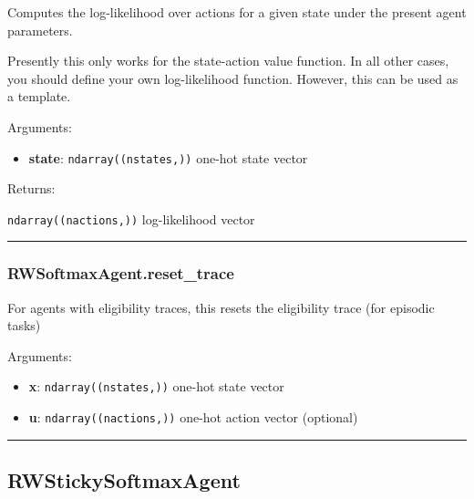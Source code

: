 Computes the log-likelihood over actions for a given state under the
present agent parameters.

Presently this only works for the state-action value function. In all
other cases, you should define your own log-likelihood function.
However, this can be used as a template.

Arguments:

\begin{itemize}
\tightlist
\item
  \textbf{state}: \texttt{ndarray((nstates,))} one-hot state vector
\end{itemize}

Returns:

\texttt{ndarray((nactions,))} log-likelihood vector

\begin{center}\rule{0.5\linewidth}{\linethickness}\end{center}

\subsubsection{RWSoftmaxAgent.reset\_trace}\label{rwsoftmaxagent.reset_trace}

\begin{Shaded}
\begin{Highlighting}[]
\OperatorTok{=}\NormalTok{)}
\end{Highlighting}
\end{Shaded}

For agents with eligibility traces, this resets the eligibility trace
(for episodic tasks)

Arguments:

\begin{itemize}
\tightlist
\item
  \textbf{x}: \texttt{ndarray((nstates,))} one-hot state vector
\item
  \textbf{u}: \texttt{ndarray((nactions,))} one-hot action vector
  (optional)
\end{itemize}

\begin{center}\rule{0.5\linewidth}{\linethickness}\end{center}

\subsection{RWStickySoftmaxAgent}\label{rwstickysoftmaxagent}

